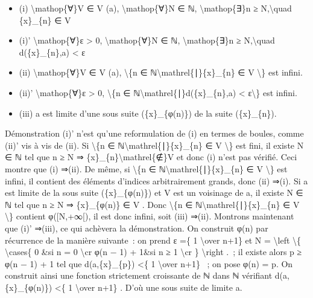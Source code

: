 \documentclass[]{article}
\begin{document}
\begin{itemize}
\itemsep1pt\parskip0pt
\item
  (i) \textbackslash{}mathop\{∀\}V ∈ V (a), \textbackslash{}mathop\{∀\}N
  ∈ ℕ, \textbackslash{}mathop\{∃\}n ≥ N,\textbackslash{}quad
  \{x\}\_\{n\} ∈ V
\item
  (i)' \textbackslash{}mathop\{∀\}ε \textgreater{} 0,
  \textbackslash{}mathop\{∀\}N ∈ ℕ, \textbackslash{}mathop\{∃\}n ≥
  N,\textbackslash{}quad d(\{x\}\_\{n\},a) \textless{} ε
\item
  (ii) \textbackslash{}mathop\{∀\}V ∈ V (a), \textbackslash{}\{n ∈
  ℕ\textbackslash{}mathrel\{∣\}\{x\}\_\{n\} ∈ V \textbackslash{}\} est
  infini.
\item
  (ii)' \textbackslash{}mathop\{∀\}ε \textgreater{} 0,
  \textbackslash{}\{n ∈ ℕ\textbackslash{}mathrel\{∣\}d(\{x\}\_\{n\},a)
  \textless{} ε\textbackslash{}\} est infini.
\item
  (iii) a est limite d'une sous suite (\{x\}\_\{φ(n)\}) de la suite
  (\{x\}\_\{n\}).
\end{itemize}

Démonstration (i)' n'est qu'une reformulation de (i) en termes de
boules, comme (ii)' vis à vis de (ii). Si \textbackslash{}\{n ∈
ℕ\textbackslash{}mathrel\{∣\}\{x\}\_\{n\} ∈ V \textbackslash{}\} est
fini, il existe N ∈ ℕ tel que n ≥ N ⇒
\{x\}\_\{n\}\textbackslash{}mathrel\{∉\}V et donc (i) n'est pas vérifié.
Ceci montre que (i) ⇒(ii). De même, si \textbackslash{}\{n ∈
ℕ\textbackslash{}mathrel\{∣\}\{x\}\_\{n\} ∈ V \textbackslash{}\} est
infini, il contient des éléments d'indices arbitrairement grands, donc
(ii) ⇒(i). Si a est limite de la sous suite (\{x\}\_\{φ(n)\}) et V est
un voisinage de a, il existe N ∈ ℕ tel que n ≥ N ⇒ \{x\}\_\{φ(n)\} ∈ V .
Donc \textbackslash{}\{n ∈ ℕ\textbackslash{}mathrel\{∣\}\{x\}\_\{n\} ∈ V
\textbackslash{}\} contient φ({[}N,+∞{[}), il est donc infini, soit
(iii) ⇒(ii). Montrons maintenant que (i)' ⇒(iii), ce qui achèvera la
démonstration. On construit φ(n) par récurrence de la manière suivante~:
on prend ε =\{ 1 \textbackslash{}over n+1\} et N = \textbackslash{}left
\textbackslash{}\{ \textbackslash{}cases\{ 0 \&si n = 0
\textbackslash{}cr φ(n − 1) + 1\&si n ≥ 1 \textbackslash{}cr \}
\textbackslash{}right .~; il existe alors p ≥ φ(n − 1) + 1 tel que
d(a,\{x\}\_\{p\}) \textless{}\{ 1 \textbackslash{}over n+1\} ~; on pose
φ(n) = p. On construit ainsi une fonction strictement croissante de ℕ
dans ℕ vérifiant d(a,\{x\}\_\{φ(n)\}) \textless{}\{ 1
\textbackslash{}over n+1\} . D'où une sous suite de limite a.
\end{document}
